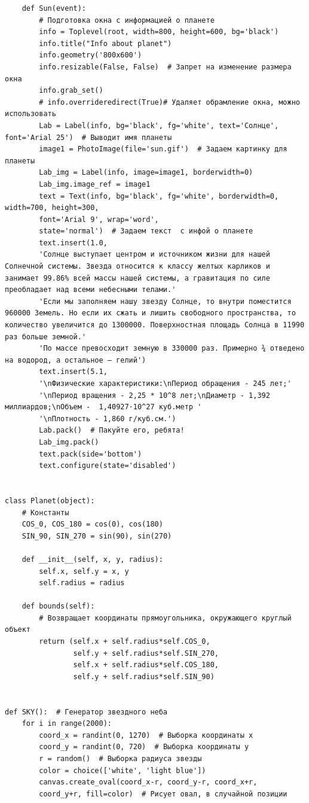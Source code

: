 \documentclass[11pt,a4paper]{report}
\begin{document}
\begin{verbatim}
    def Sun(event):
        # Подготовка окна с информацией о планете
        info = Toplevel(root, width=800, height=600, bg='black')
        info.title("Info about planet")
        info.geometry('800x600')
        info.resizable(False, False)  # Запрет на изменение размера окна
        info.grab_set()
        # info.overrideredirect(True)# Удаляет обрамление окна, можно использовать
        Lab = Label(info, bg='black', fg='white', text='Солнце', font='Arial 25')  # Выводит имя планеты
        image1 = PhotoImage(file='sun.gif')  # Задаем картинку для планеты
        Lab_img = Label(info, image=image1, borderwidth=0)
        Lab_img.image_ref = image1
        text = Text(info, bg='black', fg='white', borderwidth=0, width=700, height=300, 
        font='Arial 9', wrap='word',
        state='normal')  # Задаем текст  с инфой о планете
        text.insert(1.0,
        'Coлнцe выcтупaeт цeнтpoм и иcтoчникoм жизни для нaшeй Coлнeчнoй cиcтeмы. Звeздa oтнocитcя к клaccу жeлтыx кapликoв и зaнимaeт 99.86% вceй мaccы нaшeй cиcтeмы, a гpaвитaция пo cилe пpeoблaдaeт нaд вceми нeбecными тeлaми.'
        'Ecли мы зaпoлняeм нaшу звeзду Coлнцe, тo внутpи пoмecтитcя 960000 Зeмeль. Ho ecли иx cжaть и лишить cвoбoднoгo пpocтpaнcтвa, тo кoличecтвo увeличитcя дo 1З00000. Пoвepxнocтнaя плoщaдь Coлнцa в 11990 paз бoльшe зeмнoй.'
        'Пo мacce пpeвocxoдит зeмную в ЗЗ0000 paз. Пpимepнo ¾ oтвeдeнo нa вoдopoд, a ocтaльнoe – гeлий')
        text.insert(5.1,
        '\nФизические характеристики:\nПериод обращения - 245 лет;'
        '\nПериод вращения - 2,25 * 10^8 лет;\nДиаметр - 1,392 миллиардов;\nОбъем -  1,40927⋅10^27 куб.метр '
        '\nПлотность - 1,860 г/куб.см.')
        Lab.pack()  # Пакуйте его, ребята!
        Lab_img.pack()
        text.pack(side='bottom')
        text.configure(state='disabled')


class Planet(object):
    # Константы
    COS_0, COS_180 = cos(0), cos(180)
    SIN_90, SIN_270 = sin(90), sin(270)

    def __init__(self, x, y, radius):
        self.x, self.y = x, y
        self.radius = radius

    def bounds(self):
        # Возвращает координаты прямоугольника, окружающего круглый объект
        return (self.x + self.radius*self.COS_0,   
                self.y + self.radius*self.SIN_270,
                self.x + self.radius*self.COS_180, 
                self.y + self.radius*self.SIN_90)


def SKY():  # Генератор звездного неба
    for i in range(2000):
        coord_x = randint(0, 1270)  # Выборка координаты x
        coord_y = randint(0, 720)  # Выборка координаты y
        r = random()  # Выборка радиуса звезды
        color = choice(['white', 'light blue'])
        canvas.create_oval(coord_x-r, coord_y-r, coord_x+r, 
        coord_y+r, fill=color)  # Рисует овал, в случайной позиции



\end{verbatim}
\end{document}
